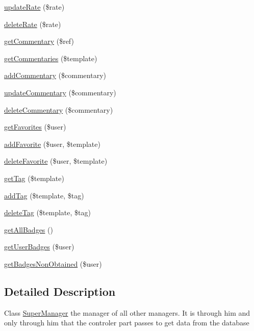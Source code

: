 \begin{DoxyCompactItemize}
\item 
\hyperlink{classSuperManager_a15ec9cb9abd7c588206f8a81d78d282e}{update\+Rate} (\$rate)
\item 
\hyperlink{classSuperManager_af5bffd1255bd599146767d7a1c6f44fa}{delete\+Rate} (\$rate)
\item 
\hyperlink{classSuperManager_a8ca540bb9bc9a9afc4914d93288a4fb3}{get\+Commentary} (\$ref)
\item 
\hyperlink{classSuperManager_a71ce25db0a1b54bb4daee8ef9db22f0d}{get\+Commentaries} (\$template)
\item 
\hyperlink{classSuperManager_a4d35255f704358ecbf1ea32ab632952a}{add\+Commentary} (\$commentary)
\item 
\hyperlink{classSuperManager_afc109268bb8e48b702cf507fa6f17133}{update\+Commentary} (\$commentary)
\item 
\hyperlink{classSuperManager_aa872d42f3b00783f14cc6d9729f82372}{delete\+Commentary} (\$commentary)
\item 
\hyperlink{classSuperManager_a44ae73fb70303a49408182d4e43e7bf6}{get\+Favorites} (\$user)
\item 
\hyperlink{classSuperManager_a6a9c33259590b2be5d43a9aa99bd3116}{add\+Favorite} (\$user, \$template)
\item 
\hyperlink{classSuperManager_addca4600732dc62d5210a4cdfd08bd29}{delete\+Favorite} (\$user, \$template)
\item 
\hyperlink{classSuperManager_a9d9e312e8f4f4c105b619c37cfe05908}{get\+Tag} (\$template)
\item 
\hyperlink{classSuperManager_a3f6f650d38f315c2326255fdb8f80c20}{add\+Tag} (\$template, \$tag)
\item 
\hyperlink{classSuperManager_ac8addd12cd4018e09543c6f7eca23bb4}{delete\+Tag} (\$template, \$tag)
\item 
\hyperlink{classSuperManager_afbf253681e05119eb1eca99adf0a9f54}{get\+All\+Badges} ()
\item 
\hyperlink{classSuperManager_aad2062dca6a3577a9d852c4edf9b1189}{get\+User\+Badges} (\$user)
\item 
\hyperlink{classSuperManager_af5a189e3061acbf92dc040183b4eaefc}{get\+Badges\+Non\+Obtained} (\$user)
\end{DoxyCompactItemize}


\subsection{Detailed Description}
Class \hyperlink{classSuperManager}{Super\+Manager} the manager of all other managers. It is through him and only through him that the controler part passes to get data from the database 

